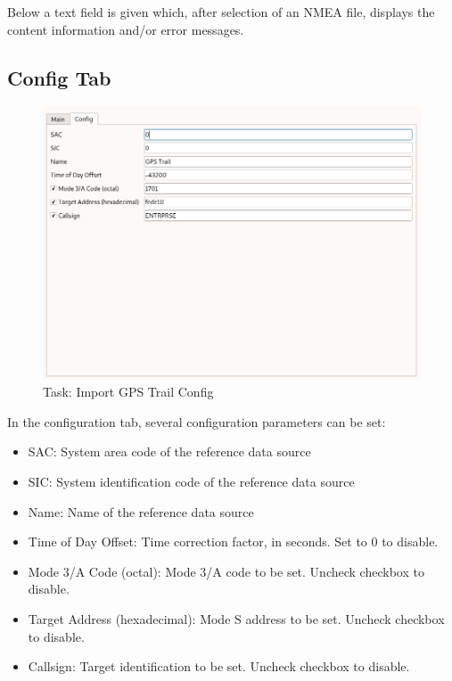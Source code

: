 Below a text field is given which, after selection of an NMEA file, displays the content information and/or error messages. \\

\subsection{Config Tab}

\begin{figure}[H]
    \includegraphics[width=16cm,frame]{../screenshots/gps_import_config.png}
  \caption{Task: Import GPS Trail Config}
\end{figure}

In the configuration tab, several configuration parameters can be set:

\begin{itemize}  
\item SAC: System area code of the reference data source
\item SIC: System identification code of the reference data source
\item Name: Name of the reference data source
\item Time of Day Offset: Time correction factor, in seconds. Set to 0 to disable.
\item Mode 3/A Code (octal): Mode 3/A code to be set. Uncheck checkbox to disable.
\item Target Address (hexadecimal): Mode S address to be set. Uncheck checkbox to disable.
\item Callsign: Target identification to be set. Uncheck checkbox to disable.
\end{itemize}
\ \\


